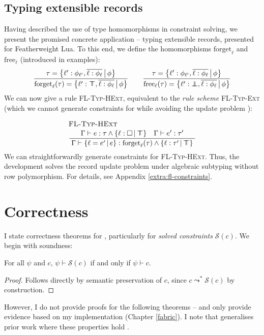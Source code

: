 \subsection{Typing extensible records}
Having described the use of type homomorphisms in constraint solving, we present the promised concrete application -- typing extensible records, presented for Featherweight Lua. To this end, we define the homomorphisms $\mathrm{forget}_\ell$ and $\mathrm{free}_\ell$ (introduced in examples):
$$ 
\dfrac
  {\tau = \flext{\ell' : \phi_{\ell'},  \overline{\ell : \phi_\ell}}{\phi}}
  {\mathrm{forget}_\ell(\tau) = \flext{\ell' : \flftop,  \overline{\ell : \phi_\ell}}{\phi}}
\qquad 
\dfrac
  {\tau = \flext{\ell' : \phi_{\ell'},  \overline{\ell : \phi_\ell}}{\phi}}
  {\mathrm{free}_\ell(\tau) = \flext{\ell' : \flfbot,  \overline{\ell : \phi_\ell}}{\phi}}
$$
We can now give a rule \textsc{FL-Typ-HExt}, equivalent to the \emph{rule scheme} \textsc{FL-Typ-Ext} (which we cannot generate constraints for while avoiding the update problem \cite{operations-on-records}):
$$ 
\irule{FL-Typ-HExt}{\Gamma \vdash e : \tau \meet \flext{\ell : \flabsent}{\flftop} \quad \Gamma \vdash e' : \tau'}{\Gamma \vdash \flext{\ell = e'}{e} : \mathrm{forget}_\ell(\tau) \meet \flext{\ell : \tau'}{\flftop}}
$$
We can straightforwardly generate constraints for 
\textsc{FL-Typ-HExt}.
Thus, the development solves the record update problem under algebraic subtyping without row polymorphism. For details, see Appendix \ref{extra:fl-constraints}.

\section{Correctness}
\label{sec:correctness}

I state correctness theorems for \inference{}, particularly for \emph{solved constraints} $\mathcal S(c)$. We begin with soundness:
\begin{theorem}[Soundness]
    For all $\psi$ and $c$, $\psi \vdash \mathcal S(c)$ if and only if $\psi \vdash c$.
\end{theorem}
\begin{proof}
    Follows directly by semantic preservation of $c$, since $c \leadsto^* \mathcal S(c)$ by construction.
\end{proof}

However, I do not provide proofs for the following theorems -- and only provide evidence based on my implementation (Chapter \ref{fabric}). I note that \inference{} generalises prior work where these properties hold \cite{simple-sub, mlstruct}. 

